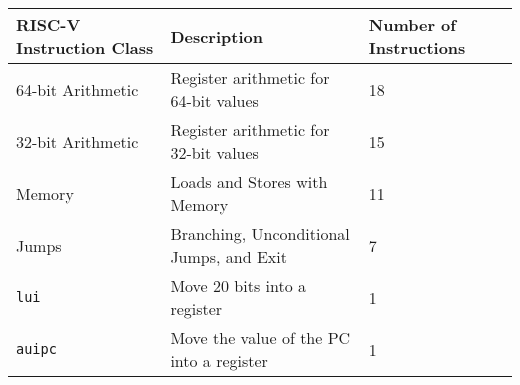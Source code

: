\begin{tabular}{lll}
\toprule
RISC-V Instruction Class & Description & Number of Instructions\\
\midrule
  64-bit Arithmetic & Register arithmetic for 64-bit values & 18 \\
  32-bit Arithmetic & Register arithmetic for 32-bit values & 15 \\
  Memory & Loads and Stores with Memory & 11 \\
  Jumps & Branching, Unconditional Jumps, and Exit & 7 \\
  \texttt{lui} & Move 20 bits into a register & 1 \\
  \texttt{auipc} & Move the value of the PC into a register & 1 \\
\bottomrule
\end{tabular}
